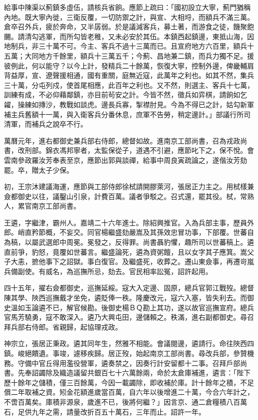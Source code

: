 \begin{pinyinscope}
給事中陳渠以薊鎮多虛伍，請核兵省餉。應節上疏曰：「國初設立大寧，薊門猶稱內地。既大寧內徙，三衛反覆，一切防禦之計，與宣、大相埒，而額兵不滿三萬。倉卒召外兵，疲於奔命，又半孱弱。於是議減客兵，募土著，而游食之徒，饑聚飽颺。請清勾逃軍，而所勾皆老稚，又未必安於其伍。本鎮西起鎮邊，東抵山海，因地制兵，非三十萬不可。今主、客兵不過十三萬而已。且宣府地方六百里，額兵十五萬；大同地方千餘里，額兵十三萬五千；今薊、昌地兼二鎮，而兵力獨不足。援彼例此，何以能守？以今上計，發精兵二十餘萬，恢復大寧，控制外邊，俾畿輔肩背益厚，宣、遼聲援相通，國有重關，庭無近寇，此萬年之利也。如其不然，集兵三十萬，分屯列戍，使首尾相應，此百年之利也。又不然，則選主、客兵十七萬，訓練有成，不必仰藉鄰鎮，亦目前茍安之計。今皆不然，徵兵如弈棋，請餉如乞糴，操練如摶沙，教戰如談虎。邊長兵寡，掣襟肘見。今為不得已之計，姑勾新軍補主兵舊額十一萬，與入衛客兵分番休息，庶軍不告勞，稍定邊計。」部議行所司清軍，而補兵之說卒不行。

萬曆元年，進右都御史兼兵部右侍郎，總督如故。進南京工部尚書，召為戎政尚書，改刑部。錦衣馮邦寧者，太監保從子，道遇不引避，應節叱下之，保不悅。會雲南參政羅汝芳奉表至京，應節出郭與談禪，給事中周良寅疏論之，遂偕汝芳劾罷。卒，贈太子少保。

初，王宗沐建議海運，應節與工部侍郎徐栻請開膠萊河，張居正力主之。用栻樣兼僉都御史以往，議鑿山引泉，計費百萬。議者爭駁之。召式還，罷其役。栻，常熟人，累官南京工部尚書。

王遴，字繼津，霸州人。嘉靖二十六年進士。除紹興推官。入為兵部主事，歷員外郎。峭直矜節概，不妄交。同官楊繼盛劾嚴嵩及其孫效忠冒功事，下部覆。世蕃自為稿，以屬武選郎中周冕。冕發之，反得罪。尚書聶豹懼，趣所司以世蕃稿上。遴直前爭，豹怒，竟覆如世蕃言。繼盛論死，遴為資粥饘，且以女字其子應箕。嵩父子大恚，摭他事下之詔獄。事白復官。及繼盛死，收葬之。遷山東僉事，再遷岢嵐兵備副使。有威名，為巡撫所忌，劾去。官民相率訟冤，詔許起用。

四十五年，擢右僉都御史，巡撫延綏。寇大入定邊、固原，總兵官郭江戰歿。總督陳其學、陜西巡撫戴才坐免，遴貶俸一秩。隆慶改元，寇六入塞，皆失利去。而御史溫如玉論遴不已，解官候勘。後御史楊ＢＱ勘上其功，遂以故官巡撫宣府。總兵官馬芳驍勇，寇不敢深入。遴乃大興屯田，邊儲賴之。秩滿，進右副都御史。尋召拜兵部右侍郎。省親歸，起協理戎政。

神宗立，張居正秉政。遴其同年生，然雅不相能。會議閱邊，遴請行。命往陜西四鎮。峻絕饋遺。事竣，遽移疾歸。居正歿，始起南京工部尚書。尋改兵部，參贊機務。守備中官丘得用濫役營軍，遴奏禁之，因奏行計安留都十二事。召拜戶部尚書。先奉詔蠲除及織造議留共銀百七十六萬餘兩，命於太倉庫補進，遴言：「陛下歷十餘年之儲積，僅三百餘萬，今因一載蠲除，即收補於庫。計十餘年之積，不足償二年取補之資。矧金花額進歲當百萬，自六年以後增進二十萬，今合六年計之，不啻百萬矣。庫積非源泉，歲進不已，後將何繼？」因言京、通二倉糧積八百萬石，足供九年之需，請量改折百五十萬石，三年而止。詔許一年。


\end{pinyinscope}
